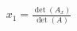 \documentclass[preview]{standalone}
\begin{document}
\begin{align*}
x_1 = \frac{\det(A_x)}{\det(A)}
\end{align*}
\end{document}
